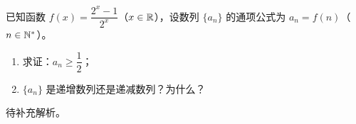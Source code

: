 \begin{prob}[source={选修二P9习题}, topic={数列的性质与运算}, score=10]
已知函数 $f(x) = \dfrac{2^x - 1}{2^x}$（$x \in \mathbb{R}$），设数列 $\{a_n\}$ 的通项公式为 $a_n = f(n)$（$n \in \mathbb{N}^*$）。
\begin{enumerate}
	\item[(1)] 求证：$a_n \ge \dfrac{1}{2}$；
	\item[(2)] $\{a_n\}$ 是递增数列还是递减数列？为什么？
\end{enumerate}
\end{prob}
\begin{prob-sol}
待补充解析。
\end{prob-sol}

